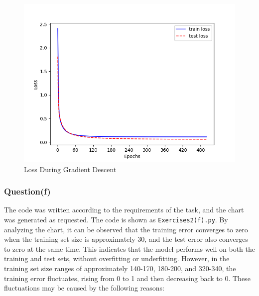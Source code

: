 \documentclass[a4paper, utf8]{ctexart}
\begin{document}
	\begin{figure}[htbp]
		\centering
		\centering
		\includegraphics[width=.6\linewidth]{./figure/2-1.png}
		\caption{Loss During Gradient Descent}
	\end{figure}
	
	\subsubsection{Question(f)}
	
	The code was written according to the requirements of the task, and the chart was generated as requested. The code is shown as \verb|Exercises2(f).py|. By analyzing the chart, it can be observed that the training error converges to zero when the training set size is approximately 30, and the test error also converges to zero at the same time. This indicates that the model performs well on both the training and test sets, without overfitting or underfitting. However, in the training set size ranges of approximately 140-170, 180-200, and 320-340, the training error fluctuates, rising from 0 to 1 and then decreasing back to 0. These fluctuations may be caused by the following reasons:
	
\end{document}
